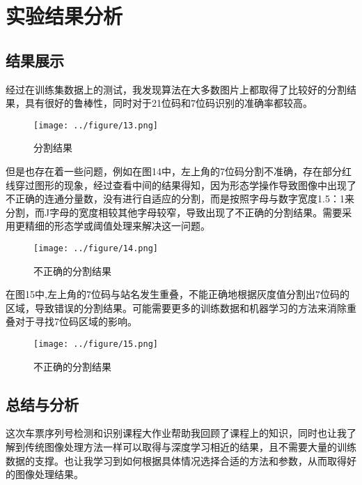 \documentclass[11pt]{ctexart}
\begin{document}
	\section{实验结果分析}
	\subsection{结果展示}
	经过在训练集数据上的测试，我发现算法在大多数图片上都取得了比较好的分割结果，具有很好的鲁棒性，同时对于21位码和7位码识别的准确率都较高。
	
	\begin{figure}[h]
		\centering
		\texttt{[image: ../figure/13.png]}
		\caption{分割结果}
	\end{figure}
	
	但是也存在着一些问题，例如在图14中，左上角的7位码分割不准确，存在部分红线穿过图形的现象，经过查看中间的结果得知，因为形态学操作导致图像中出现了不正确的连通分量数，没有进行自适应的分割，而是按照字母与数字宽度1.5：1来分割，而J字母的宽度相较其他字母较窄，导致出现了不正确的分割结果。需要采用更精细的形态学或阈值处理来解决这一问题。
	
	\begin{figure}[h]
		\centering
		\texttt{[image: ../figure/14.png]}
		\caption{不正确的分割结果}
	\end{figure}

	在图15中,左上角的7位码与站名发生重叠，不能正确地根据灰度值分割出7位码的区域，导致错误的分割结果。可能需要更多的训练数据和机器学习的方法来消除重叠对于寻找7位码区域的影响。
	
	\begin{figure}[h]
		\centering
		\texttt{[image: ../figure/15.png]}
		\caption{不正确的分割结果}
	\end{figure}
	
	\subsection{总结与分析}
	
	这次车票序列号检测和识别课程大作业帮助我回顾了课程上的知识，同时也让我了解到传统图像处理方法一样可以取得与深度学习相近的结果，且不需要大量的训练数据的支撑。也让我学习到如何根据具体情况选择合适的方法和参数，从而取得好的图像处理结果。
	
\end{document}
